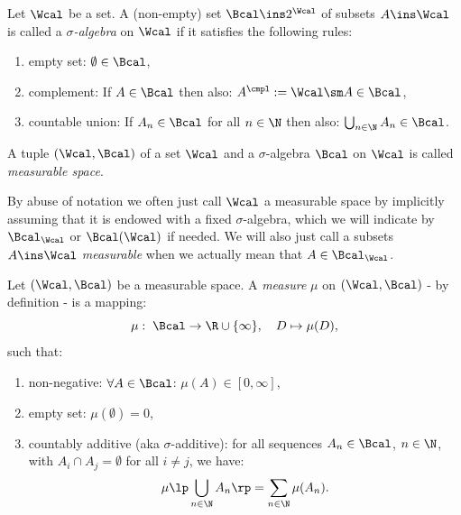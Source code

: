 \begin{Def}
    \label{def-sigma-algebra}
    Let $\Wcal$ be a set. A (non-empty) set $\Bcal \ins 2^\Wcal$ of subsets $A \ins \Wcal$ is called a 
    \emph{$\sigma$-algebra} on $\Wcal$ if it satisfies the following rules:
    \begin{enumerate}[label=\roman*)]
        \item empty set: $\emptyset \in \Bcal$,
        \item complement: If $A \in \Bcal$ then also: $A^\cmpl:= \Wcal\sm A \in \Bcal$,
        \item countable union: If $A_n \in \Bcal$ for all $n \in \N$ then also: $\bigcup_{n \in \N} A_n \in \Bcal$.
    \end{enumerate}
\end{Def}

\begin{Def}
    \label{def-measurable-space}
    A tuple $(\Wcal,\Bcal)$ of a set $\Wcal$ and a $\sigma$-algebra $\Bcal$ on $\Wcal$ is called \emph{measurable space}.
\end{Def}

\begin{Rem}
 By abuse of notation we often just call $\Wcal$ a measurable space by implicitly assuming that it is endowed with a fixed $\sigma$-algebra, which we will indicate by $\Bcal_\Wcal$ or $\Bcal(\Wcal)$ if needed. We will also just call a subsets $A \ins \Wcal$ \emph{measurable} when we actually mean that $A \in \Bcal_\Wcal$.
\end{Rem}

\begin{Def}[Measures]
    \label{def-measure}
    Let $(\Wcal,\Bcal)$ be a measurable space.
    A \emph{measure} $\mu$ on $(\Wcal,\Bcal)$ - by definition - is a mapping:
    \[\mu: \; \Bcal \to \R \cup \{\infty\},\quad D \mapsto \mu(D), \]
    such that:
    \begin{enumerate}[label=\roman*)]
        \item non-negative: $\forall A \in \Bcal$: $\mu(A) \in [0,\infty]$,
        \item empty set: $\mu(\emptyset) =0$,
        \item countably additive (aka $\sigma$-additive): for all sequences $A_n \in \Bcal$, $n \in \N$, with $A_i \cap A_j = \emptyset$ for all $i \neq j$, we have:
    \[\mu\lp\bigcup_{n \in \N} A_n\rp = \sum_{n \in \N} \mu(A_n).\]
    \end{enumerate}
    \end{Def}


